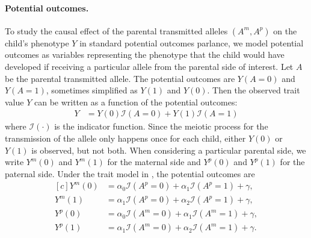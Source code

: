 \documentclass[12pt]{extarticle}
\newcommand{\indicator}{\mathcal{I}}
\begin{document}
\paragraph{Potential outcomes.} To study the causal effect of the parental transmitted alleles $(A^m,A^p)$ on the child's phenotype $Y$ in standard potential outcomes parlance, we model potential outcomes as variables representing the phenotype that the child would have developed if receiving a particular allele from the parental side of interest. Let $A$ be the parental transmitted allele. The potential outcomes are $Y(A=0)$ and $Y(A=1)$, sometimes simplified as $Y(1)$ and $Y(0)$. Then the observed trait value $Y$ can be written as a function of the potential outcomes: 
\begin{align*}
Y&=Y(0)\indicator{(A=0)}+Y(1)\indicator{(A=1)}
\end{align*}
where $\indicator(\cdot)$ is the indicator function. Since the meiotic process for the transmission of the allele only happens once for each child, either $Y(0)$ or $Y(1)$ is observed, but not both. When considering a particular parental side, we write $Y^m(0)$ and $Y^m(1)$ for the maternal side and $Y^p(0)$ and $Y^p(1)$ for the paternal side. Under the trait model in , the potential outcomes are 
\begin{equation} \label{eq:potentialoutcomes}
\begin{aligned}[c]
Y^m(0) &= \alpha_0\indicator(A^p=0) + \alpha_1\indicator(A^p=1) + \gamma, \\
Y^m(1) &= \alpha_1\indicator(A^p=0) + \alpha_2\indicator(A^p=1) + \gamma, \\
Y^p(0) &= \alpha_0\indicator(A^m=0) + \alpha_1\indicator(A^m=1) + \gamma, \\
Y^p(1) &= \alpha_1\indicator(A^m=0) + \alpha_2\indicator(A^m=1) + \gamma.
\end{aligned}
\end{equation}


\end{document}
